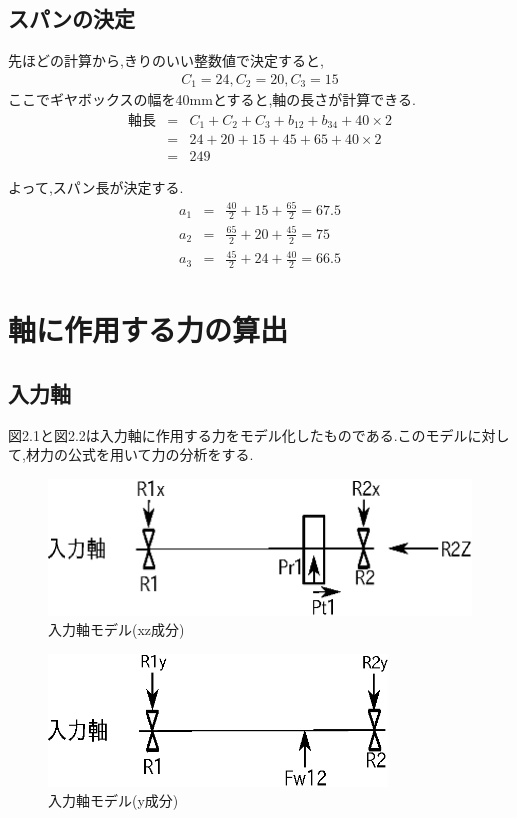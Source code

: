 \subsection{スパンの決定}
先ほどの計算から,きりのいい整数値で決定すると,
\begin{eqnarray}
C_1=24,C_2=20,C_3=15\nonumber
\end{eqnarray}
ここでギヤボックスの幅を40mmとすると,軸の長さが計算できる.
\begin{eqnarray}
軸長&=&C_1+C_2+C_3+b_{12}+b_{34}+40 \times 2\\
    &=&24+20+15+45+65+40 \times 2\\
    &=&249
\end{eqnarray}

よって,スパン長が決定する.
\begin{eqnarray}
a_1&=&\frac{40}{2} + 15 + \frac{65}{2} = 67.5\\
a_2&=&\frac{65}{2} + 20 + \frac{45}{2} = 75\\
a_3&=&\frac{45}{2} + 24 + \frac{40}{2} = 66.5
\end{eqnarray}

\section{軸に作用する力の算出}
\subsection{入力軸}
図2.1と図2.2は入力軸に作用する力をモデル化したものである.このモデルに対して,材力の公式を用いて力の分析をする.
\begin{figure}[htbp]
\begin{center}
\includegraphics[width=12cm]{../picture/jiku1.eps}
\end{center}
\caption{入力軸モデル(xz成分)}
\end{figure}
\begin{figure}[htbp]
\begin{center}
\includegraphics[width=9cm]{../picture/jiku12.eps}
\end{center}
\caption{入力軸モデル(y成分)}
\end{figure}
